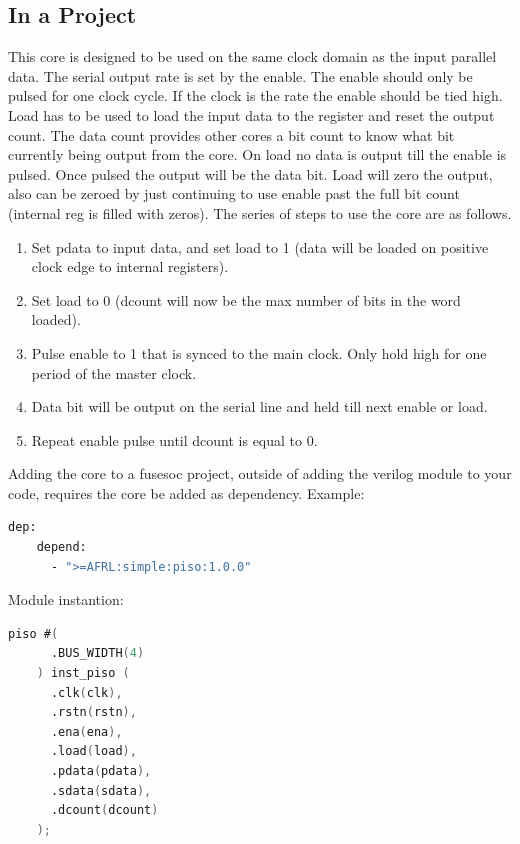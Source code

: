 

\subsection{In a Project}
\par
This core is designed to be used on the same clock domain as the input parallel data. The serial output rate is set by the enable.
The enable should only be pulsed for one clock cycle. If the clock is the rate the enable should be tied high. Load has to be
used to load the input data to the register and reset the output count. The data count provides other cores a bit count to know what bit currently being output from the core. On load no data is output till the enable is pulsed. Once pulsed the output will be the data bit. Load will zero the output, also can be zeroed by just continuing to use enable past the full bit count (internal reg is filled with zeros).
The series of steps to use the core are as follows.
\begin{enumerate}
  \item Set pdata to input data, and set load to 1 (data will be loaded on positive clock edge to internal registers).
  \item Set load to 0 (dcount will now be the max number of bits in the word loaded).
  \item Pulse enable to 1 that is synced to the main clock. Only hold high for one period of the master clock.
  \item Data bit will be output on the serial line and held till next enable or load.
  \item Repeat enable pulse until dcount is equal to 0.
\end{enumerate}

Adding the core to a fusesoc project, outside of adding the verilog module to your code, requires the core be added as dependency.
Example:
\begin{lstlisting}[language=bash]
  dep:
    depend:
      - ">=AFRL:simple:piso:1.0.0"
\end{lstlisting}

Module instantion:
\begin{lstlisting}[language=Verilog]
    piso #(
      .BUS_WIDTH(4)
    ) inst_piso (
      .clk(clk),
      .rstn(rstn),
      .ena(ena),
      .load(load),
      .pdata(pdata),
      .sdata(sdata),
      .dcount(dcount)
    );
\end{lstlisting}


